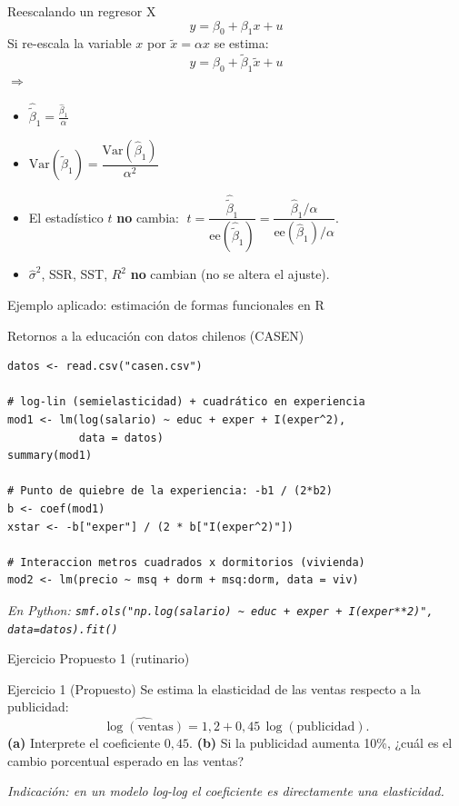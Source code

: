 \documentclass{beamer}
\begin{document}
\begin{frame}{Reescalando un regresor X }
            \[ y = \beta_0 + \beta_1 x + u\]
Si re-escala la variable $x$ por $\tilde{x} = \alpha x$ se estima:
            \[ y = \beta_0 + \tilde{\beta}_1 \tilde{x} + u\]
        $\Rightarrow$
        \begin{itemize}
            \item $\hat{\tilde{\beta}}_1 = \frac{\hat{\beta}_1}{\alpha}$
            \item $\text{Var}(\hat{\tilde{\beta}}_1) = \dfrac{\text{Var}(\hat{\beta}_1)}{\alpha^2}$
            \item El estadístico $t$ \textbf{no} cambia: $\;t = \dfrac{\hat{\tilde\beta}_1}{\text{ee}(\hat{\tilde\beta}_1)} = \dfrac{\hat\beta_1/\alpha}{\text{ee}(\hat\beta_1)/\alpha}$.
            \item $\hat{\sigma}^2$, SSR, SST, $R^2$ \textbf{no} cambian (no se altera el ajuste).
        \end{itemize}
\end{frame}

\begin{frame}[fragile]{Ejemplo aplicado: estimación de formas funcionales en R}

\begin{exampleblock}{Retornos a la educación con datos chilenos (CASEN)}
\begin{verbatim}
datos <- read.csv("casen.csv")

# log-lin (semielasticidad) + cuadrático en experiencia
mod1 <- lm(log(salario) ~ educ + exper + I(exper^2),
           data = datos)
summary(mod1)

# Punto de quiebre de la experiencia: -b1 / (2*b2)
b <- coef(mod1)
xstar <- -b["exper"] / (2 * b["I(exper^2)"])

# Interaccion metros cuadrados x dormitorios (vivienda)
mod2 <- lm(precio ~ msq + dorm + msq:dorm, data = viv)
\end{verbatim}
\end{exampleblock}

\footnotesize \textit{En Python: \texttt{smf.ols("np.log(salario) \textasciitilde\ educ + exper + I(exper**2)", data=datos).fit()}}

\end{frame}

\begin{frame}{Ejercicio Propuesto 1 (rutinario)}

\begin{block}{Ejercicio 1 (Propuesto)}
Se estima la elasticidad de las ventas respecto a la publicidad:
\[
\widehat{\log(\text{ventas})} = 1{,}2 + 0{,}45\,\log(\text{publicidad}).
\]
\textbf{(a)} Interprete el coeficiente $0{,}45$. \quad \textbf{(b)} Si la publicidad aumenta 10\%, ¿cuál es el cambio porcentual esperado en las ventas?
\end{block}

{\small \textit{Indicación: en un modelo log-log el coeficiente es directamente una elasticidad.}}

\end{frame}
\end{document}
